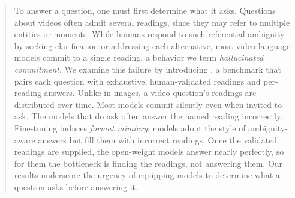 \begin{abstract}
To answer a question, one must first determine what it asks. Questions about videos often admit several readings, since they may refer to multiple entities or moments. While humans respond to such referential ambiguity by seeking clarification or addressing each alternative, most video-language models commit to a single reading, a behavior we term \textit{hallucinated commitment}. We examine this failure by introducing \textbf{\bench{}}, a benchmark that pairs each question with exhaustive, human-validated readings and per-reading answers. Unlike in images, a video question's readings are distributed over time. Most models commit silently even when invited to ask. The models that do ask often answer the named reading incorrectly. Fine-tuning induces \textit{format mimicry}: models adopt the style of ambiguity-aware answers but fill them with incorrect readings. Once the validated readings are supplied, the open-weight models answer nearly perfectly, so for them the bottleneck is finding the readings, not answering them. Our results underscore the urgency of equipping models to determine what a question asks before answering it.
\end{abstract}
